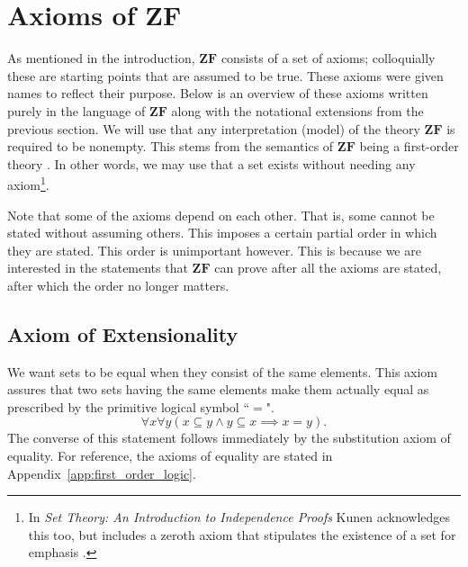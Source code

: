 \documentclass[../main.tex]{subfiles}
\begin{document}
\section{Axioms of \texorpdfstring{$\mathbf{ZF}$}{ZF}}\label{sec:zermelo_fraenkel_set_theory:axioms_of_zf}
As mentioned in the introduction, $\mathbf{ZF}$ consists of a set of axioms; colloquially these are starting points that are assumed to be true. These axioms were given names to reflect their purpose. Below is an overview of these axioms written purely in the language of $\mathbf{ZF}$ along with the notational extensions from the previous section. We will use that any interpretation (model) of the theory $\mathbf{ZF}$ is required to be nonempty. This stems from the semantics of $\mathbf{ZF}$ being a first-order theory \cite{Enderton2001}. In other words, we may use that a set exists without needing any axiom\footnote{In \textit{Set Theory: An Introduction to Independence Proofs} Kunen acknowledges this too, but includes a zeroth axiom that stipulates the existence of a set for emphasis \cite{Kunen1992}.}.

Note that some of the axioms depend on each other. That is, some cannot be stated without assuming others. This imposes a certain partial order in which they are stated. This order is unimportant however. This is because we are interested in the statements that $\mathbf{ZF}$ can prove after all the axioms are stated, after which the order no longer matters.

\subsection*{Axiom of Extensionality}\label{subsec:zermelo_fraenkel_set_theory:axiom_of_extensionality}
We want sets to be equal when they consist of the same elements. This axiom assures that two sets having the same elements make them actually equal as prescribed by the primitive logical symbol ``$=$".
\begin{equation*}
    \forall x\forall y(x\subseteq y\land y\subseteq x\implies x=y).
\end{equation*}
The converse of this statement follows immediately by the substitution axiom of equality. For reference, the axioms of equality are stated in Appendix~\ref{app:first_order_logic}.
\end{document}
